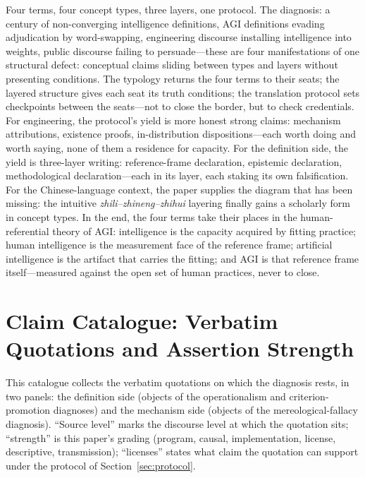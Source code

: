 \documentclass[10pt]{article}
\begin{document}
Four terms, four concept types, three layers, one protocol. The diagnosis: a century of non-converging intelligence definitions, AGI definitions evading adjudication by word-swapping, engineering discourse installing intelligence into weights, public discourse failing to persuade---these are four manifestations of one structural defect: conceptual claims sliding between types and layers without presenting conditions. The typology returns the four terms to their seats; the layered structure gives each seat its truth conditions; the translation protocol sets checkpoints between the seats---not to close the border, but to check credentials. For engineering, the protocol's yield is more honest strong claims: mechanism attributions, existence proofs, in-distribution dispositions---each worth doing and worth saying, none of them a residence for capacity. For the definition side, the yield is three-layer writing: reference-frame declaration, epistemic declaration, methodological declaration---each in its layer, each staking its own falsification. For the Chinese-language context, the paper supplies the diagram that has been missing: the intuitive \emph{zhili--zhineng--zhihui} layering finally gains a scholarly form in concept types. In the end, the four terms take their places in the human-referential theory of AGI: intelligence is the capacity acquired by fitting practice; human intelligence is the measurement face of the reference frame; artificial intelligence is the artifact that carries the fitting; and AGI is that reference frame itself---measured against the open set of human practices, never to close.




\appendix

\section{Claim Catalogue: Verbatim Quotations and Assertion Strength}\label{app:catalog}

This catalogue collects the verbatim quotations on which the diagnosis rests, in two panels: the definition side (objects of the operationalism and criterion-promotion diagnoses) and the mechanism side (objects of the mereological-fallacy diagnosis). ``Source level'' marks the discourse level at which the quotation sits; ``strength'' is this paper's grading (program, causal, implementation, license, descriptive, transmission); ``licenses'' states what claim the quotation can support under the protocol of Section~\ref{sec:protocol}.
\end{document}
